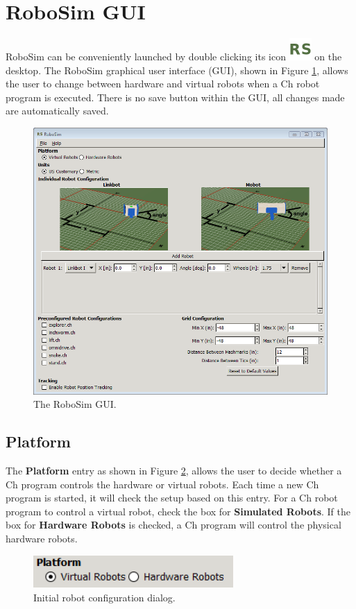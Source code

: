 \documentclass{article}
\begin{document}
\section{RoboSim GUI}
\label{sec:gui}
RoboSim can be conveniently launched by double clicking its icon
\includegraphics[height=24pt]{images/robosim} on the desktop.  The RoboSim
graphical user interface (GUI), shown in Figure \ref{fig:gui}, allows the user
to change between hardware and virtual robots when a Ch robot program is
executed.  There is no save button within the GUI, all changes made are
automatically saved.
\begin{figure}[H]
	\begin{center}
		\includegraphics[width=6in]{images/gui}
	\end{center}
	\caption{The RoboSim GUI.}
	\label{fig:gui}
\end{figure}

\subsection{Platform}
The {\bf Platform} entry as shown in Figure \ref{fig:platform}, allows the user
to decide whether a Ch program controls the hardware or virtual robots.  Each
time a new Ch program is started, it will check the setup based on this entry.
For a Ch robot program to control a virtual robot, check the box for {\bf
Simulated Robots}.  If the box for {\bf Hardware Robots} is checked, a Ch
program will control the physical hardware robots.
\begin{figure}[H]
	\begin{center}
		\includegraphics[width=3in]{images/gui_platform}
	\end{center}
	\caption{Initial robot configuration dialog.}
	\label{fig:platform}
\end{figure}
\end{document}
